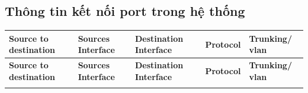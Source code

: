 \documentclass[a4paper, 12pt]{article}
\begin{document}
\subsection{Thông tin kết nối port trong hệ thống}
\begin{center}
\def\arraystretch{2.1}\begin{longtable}{|p{}|p{}|p{}|p{}|p{}|}


\hline \textbf{Source to destination }    &      \textbf{Sources Interface }    &      \textbf{Destination Interface }    &    \textbf{Protocol } &     \textbf{Trunking/ vlan }\\ \hline
\endfirsthead



\hline \textbf{Source to destination } &  \textbf{Sources Interface } &  \textbf{Destination Interface } &  \textbf{Protocol } &  \textbf{Trunking/ vlan} \\ \hline
\endhead


\endfoot


\endlastfoot



\end{longtable}
\end{center}
\end{document}
